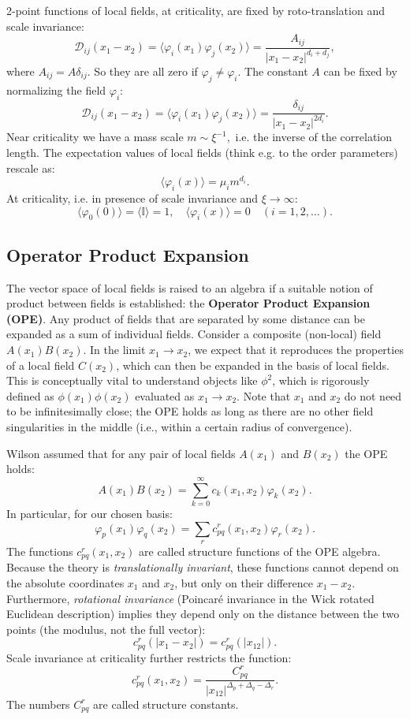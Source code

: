 2-point functions of local fields, at criticality, are fixed by roto-translation and scale invariance:
\[
    \mathcal{D}_{ij}(x_{1}-x_{2})=\langle\varphi_{i}(x_{1})\varphi_{j}(x_{2})\rangle=\frac{A_{ij}}{|x_{1}-x_{2}|^{d_{i}+d_{j}}},
\]
where \(A_{ij}=A\delta_{ij}\). So they are all zero if \(\varphi_{j} \neq \varphi_{i}\). The constant \(A\) can be fixed by normalizing the field \(\varphi_{i}\):
\[
    \mathcal{D}_{ij}(x_{1}-x_{2})=\langle\varphi_{i}(x_{1})\varphi_{j}(x_{2})\rangle=\frac{\delta_{ij}}{|x_{1}-x_{2}|^{2d_{i}}}.
\]
Near criticality we have a mass scale \(m\sim\xi^{-1},\) i.e. the inverse of the correlation length. The expectation values of local fields (think e.g. to the order parameters) rescale as:
\[
    \langle\varphi_{i}(x)\rangle=\mu_{i}m^{d_{i}}.
\]
At criticality, i.e. in presence of scale invariance and \(\xi\rightarrow\infty\):
\[
    \langle\varphi_{0}(0)\rangle=\langle\mathbb{I}\rangle=1, \quad \langle\varphi_{i}(x)\rangle=0 \quad (i=1,2,\dots).
\]

\subsection{Operator Product Expansion}

The vector space of local fields is raised to an algebra if a suitable notion of product between fields is established: the \textbf{Operator Product Expansion (OPE)}.
Any product of fields that are separated by some distance can be expanded as a sum of individual fields. Consider a composite (non-local) field \(A(x_{1})B(x_{2})\). In the limit \(x_{1}\rightarrow x_{2}\), we expect that it reproduces the properties of a local field \(C(x_{2})\), which can then be expanded in the basis of local fields. This is conceptually vital to understand objects like \(\phi^2\), which is rigorously defined as \(\phi(x_1)\phi(x_2)\) evaluated as \(x_1 \to x_2\). Note that \(x_1\) and \(x_2\) do not need to be infinitesimally close; the OPE holds as long as there are no other field singularities in the middle (i.e., within a certain radius of convergence).

Wilson assumed that for any pair of local fields \(A(x_{1})\) and \(B(x_{2})\) the OPE holds:
\[
    A(x_{1})B(x_{2})=\sum_{k=0}^{\infty}c_{k}(x_{1},x_{2})\varphi_{k}(x_{2}).
\]
In particular, for our chosen basis:
\[
    \varphi_{p}(x_{1})\varphi_{q}(x_{2})=\sum_{r}c_{pq}^{r}(x_{1},x_{2})\varphi_{r}(x_{2}).
\]
The functions \(c_{pq}^{r}(x_{1},x_{2})\) are called structure functions of the OPE algebra. Because the theory is \textit{translationally invariant}, these functions cannot depend on the absolute coordinates \(x_1\) and \(x_2\), but only on their difference \(x_1 - x_2\). Furthermore, \textit{rotational invariance} (Poincar\'e invariance in the Wick rotated Euclidean description) implies they depend only on the distance between the two points (the modulus, not the full vector):
\[
    c_{pq}^{r}(|x_{1}-x_{2}|)=c_{pq}^{r}(|x_{12}|).
\]
Scale invariance at criticality further restricts the function:
\[
    c_{pq}^{r}(x_{1},x_{2})=\frac{C_{pq}^{r}}{|x_{12}|^{\Delta_{p}+\Delta_{q}-\Delta_{r}}}.
\]
The numbers \(C_{pq}^{r}\) are called structure constants.

